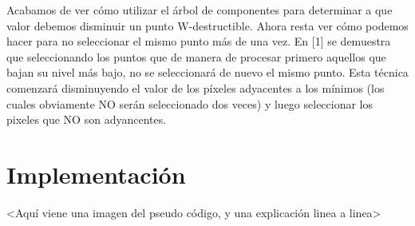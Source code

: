 Acabamos de ver cómo utilizar el árbol de componentes para determinar a que valor debemos disminuir un punto W-destructible. Ahora resta ver cómo podemos hacer para no seleccionar el mismo punto más de una vez. En [1] se demuestra que seleccionando los puntos que de manera de procesar primero aquellos que bajan su nivel más bajo, no se seleccionará de nuevo el mismo punto. Esta técnica comenzará disminuyendo el valor de los píxeles adyacentes a los mínimos (los cuales obviamente NO serán seleccionado dos veces) y luego seleccionar los pixeles que NO son adyancentes.

  
\section{Implementación}

<Aquí viene una imagen del pseudo código, y una explicación linea a linea>

